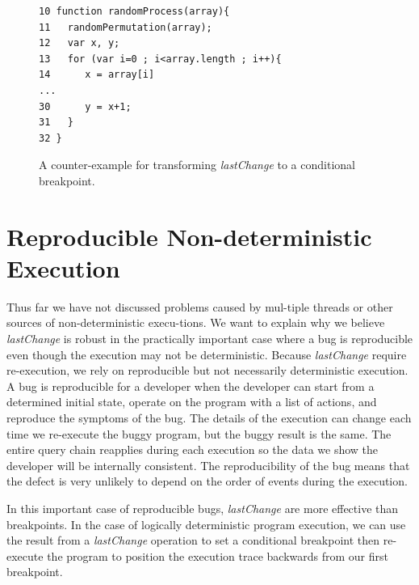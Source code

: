 \documentclass[preprint]{sigplanconf}
\begin{document}
\begin{figure}[htp]
\begin{verbatim}
10 function randomProcess(array){
11   randomPermutation(array);
12   var x, y;
13   for (var i=0 ; i<array.length ; i++){
14      x = array[i]
...
30      y = x+1;
31   }
32 }
\end{verbatim}
\caption{A counter-example for transforming \textit{lastChange} to a conditional breakpoint.}
\label{fig:counter-example}
\end{figure}
 

\section{Reproducible Non-deterministic Execution}
Thus far we have not discussed problems caused by mul-tiple threads or other sources of non-deterministic execu-tions. We want to explain why we believe \textit{lastChange} is robust in the practically important case where a bug is reproducible even though the execution may not be deterministic. 
Because \textit{lastChange} require re-execution, we rely on reproducible but not necessarily deterministic execution. A bug is reproducible for a developer when the developer can start from a determined initial state, operate on the program with a list of actions, and reproduce the symptoms of the bug. The details of the execution can change each time we re-execute the buggy program, but the buggy result is the same. The entire query chain reapplies during each execution so the data we show the developer will be internally consistent. The reproducibility of the bug means that the defect is very unlikely to depend on the order of events during the execution.

In this important case of reproducible bugs, \textit{lastChange} are more effective than breakpoints. In the case of logically deterministic program execution, we can use the result from a \textit{lastChange} operation to set a conditional breakpoint then re-execute the program to position the execution trace backwards from our first breakpoint. %
\end{document}
